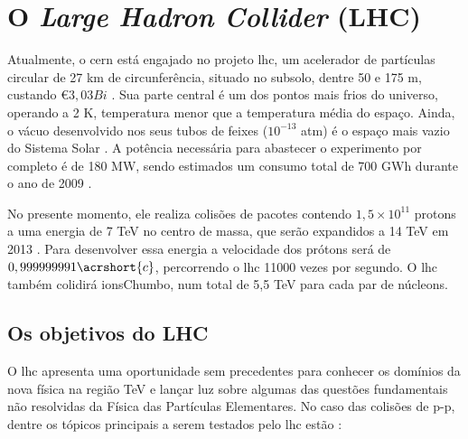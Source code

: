 \section{O \emph{Large Hadron Collider} (LHC)}
\label{sec:lhc}


Atualmente, o \gls{cern} está engajado no projeto \gls{lhc}, 
um acelerador de partículas circular de 27 km de
circunferência, situado no subsolo, dentre 50 e 175 m, custando \euro $3,03
Bi$ \cite{webLHC}. Sua parte central é um dos pontos mais frios do universo,
operando a 2 K, temperatura menor que a temperatura média do espaço. Ainda, o
vácuo desenvolvido nos seus tubos de feixes ($10^{-13}$ atm) é o espaço mais vazio do Sistema
Solar \cite{closerLook}. A potência necessária para abastecer o experimento por
completo é de 180 MW, sendo estimados um consumo total de 700 GWh durante o
ano de 2009 \cite{webLHC}. 

No presente momento, ele realiza colisões de pacotes contendo $1,5\times10^{11}$ \gls{protons} 
a uma energia de 7 TeV no centro de massa, que serão expandidos a 14 TeV em 2013
\cite{webATLAS}. Para desenvolver essa energia a velocidade dos prótons será de 
$0,999999991\acrshort{c}$, percorrendo o \gls{lhc} 11000 vezes por segundo.
O \gls{lhc} também colidirá \gls{ionsChumbo}, num total de 5,5 TeV para cada par
de núcleons.

\subsection{Os objetivos do LHC}
\label{ssec:obj_lhc}

O \gls{lhc} apresenta uma oportunidade sem precedentes para conhecer os domínios da
nova física na região TeV e lançar luz sobre algumas das questões fundamentais
não resolvidas da Física das Partículas Elementares.
No caso das colisões de p-p, dentre os tópicos principais a serem testados pelo
\gls{lhc} estão \cite{hunt_for_physics}:

